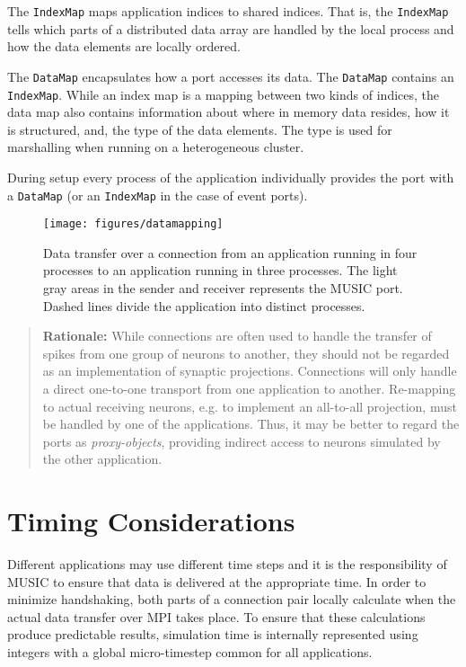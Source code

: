 \documentclass[a4paper,twoside]{report}
\newenvironment{rationale}%
{\par\begin{quote}\textbf{Rationale:}}%
{\par\end{quote}}
\begin{document}
The \lstinline|IndexMap| maps application indices to shared indices.
That is, the \lstinline|IndexMap| tells which parts of a distributed
data array are handled by the local process and how the data elements
are locally ordered.

The \lstinline|DataMap| encapsulates how a port accesses its data.
The \lstinline|DataMap| contains an \lstinline|IndexMap|.  While an
index map is a mapping between two kinds of indices, the data map also
contains information about where in memory data resides, how it is
structured, and, the type of the data elements.  The type is used for
marshalling when running on a heterogeneous cluster.

During setup every process of the application individually provides
the port with a \lstinline|DataMap| (or an \lstinline|IndexMap| in
the case of event ports).

\begin{figure}
  \begin{center}
    \texttt{[image: figures/datamapping]}
    \caption[Mapping of data]{\label{fig:datamapping} Data transfer
      over a connection from an application running in four processes
      to an application running in three processes.  The light gray
      areas in the sender and receiver represents the MUSIC port.
      Dashed lines divide the application into distinct processes.  }
  \end{center}
\end{figure}

\begin{rationale}
  While connections are often used to handle the transfer of spikes
  from one group of neurons to another, they should not be regarded as
  an implementation of synaptic projections.
  Connections will only handle a direct one-to-one transport from one
  application to another.  Re-mapping to actual receiving neurons,
  e.g. to implement an all-to-all projection, must be handled by one
  of the applications.  Thus, it may be better to regard the ports as
  \emph{proxy-objects}, providing indirect access
  to neurons simulated by the other application.
\end{rationale}


\section{Timing Considerations}
\label{sec:timing}
  
Different applications may use different time steps and it is the
responsibility of MUSIC to ensure that data is delivered at the
appropriate time.  In order to minimize handshaking, both parts of a
connection pair locally calculate when the actual data transfer over
MPI takes place.  To ensure that these calculations produce
predictable results, simulation time is internally represented using
integers with a global micro-timestep common for
all applications.
\end{document}
